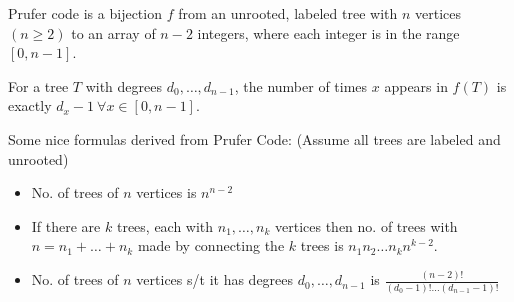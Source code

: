 Prufer code is a bijection $f$ from an unrooted, labeled tree with $n$ vertices $(n \geq 2)$ to
an array of $n - 2$ integers, where each integer is in the range $[0, n - 1]$.

For a tree $T$ with degrees $d_0,\dotsc,d_{n - 1}$, the number of times 
$x$ appears in $f(T)$ is exactly $d_x - 1 \ \forall x \in [0, n - 1]$.

Some nice formulas derived from Prufer Code: (Assume all trees are labeled and unrooted)
\begin{itemize}
    \item No. of trees of $n$ vertices is $n^{n - 2}$
    
    \item If there are $k$ trees, each with $n_1,\dotsc,n_k$ vertices
    then no. of trees with $n = n_1 + \dotsc + n_k$ made by connecting the $k$ trees
    is $n_1 n_2 \dotsc n_k n^{k - 2}$.
    
    \item No. of trees of $n$ vertices s/t it has degrees $d_0,\dotsc,d_{n - 1}$
    is $\displaystyle \frac{(n - 2)!}{(d_0 - 1)! \dotsc (d_{n - 1} - 1)!}$
\end{itemize}